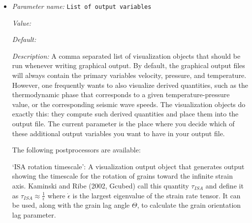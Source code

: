 \begin{itemize}
The effect of using this option can be seen in the following picture showing a variation of the output produced with the input files from Section~\ref{sec:shell-simple-2d}:

\begin{center}  \texttt{[image: viz/parameters/build-patches]}\end{center}Here, the left picture shows one visualization cell per computational cell (i.e., the option is switch off, as is the default), and the right picture shows the same simulation with the option switched on. The images show the same data, demonstrating that interpolating the solution onto bilinear shape functions as is commonly done in visualizing data loses information.

Of course, activating this option also greatly increases the amount of data \aspect{} will write to disk: approximately by a factor of 4 in 2d, and a factor of 8 in 3d, when using quadratic elements for the velocity, and correspondingly more for even higher order elements.


{\it Possible values:} A boolean value (true or false)
\item {\it Parameter name:} {\tt List of output variables}
\label{parameters:Postprocess/Visualization/List of output variables}
\label{parameters:Postprocess/Visualization/List_20of_20output_20variables}


{\it Value:} 


{\it Default:} 


{\it Description:} A comma separated list of visualization objects that should be run whenever writing graphical output. By default, the graphical output files will always contain the primary variables velocity, pressure, and temperature. However, one frequently wants to also visualize derived quantities, such as the thermodynamic phase that corresponds to a given temperature-pressure value, or the corresponding seismic wave speeds. The visualization objects do exactly this: they compute such derived quantities and place them into the output file. The current parameter is the place where you decide which of these additional output variables you want to have in your output file.

The following postprocessors are available:

`ISA rotation timescale': A visualization output object that generates output showing the timescale for the rotation of grains toward the infinite strain axis. Kaminski and Ribe (2002, Gcubed) call this quantity $\tau_{ISA}$ and define it as $\tau_{ISA} \approx \frac{1}{\dot{\epsilon}}$ where $\dot{\epsilon}$ is the largest eigenvalue of the strain rate tensor. It can be used, along with the grain lag angle $\Theta$, to calculate the grain orientation lag parameter.


\end{itemize}
